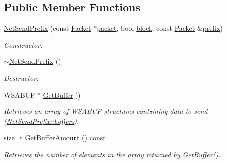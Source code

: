 \subsection*{Public Member Functions}
\begin{DoxyCompactItemize}
\item 
\hyperlink{class_net_send_prefix_ab162e1f6996ef9059b781a2c3afd71f6}{NetSendPrefix} (const \hyperlink{class_packet}{Packet} $\ast$\hyperlink{class_net_send_prefix_a90e39e80bb44c4bdd111ca489a66094e}{packet}, bool \hyperlink{class_net_send_afd9338a4ab3648178d0b5c816a0852d1}{block}, const \hyperlink{class_packet}{Packet} \&\hyperlink{class_net_send_prefix_a56b813ee0be98a6a23bdcc00863b8bba}{prefix})
\begin{DoxyCompactList}\small\item\em Constructor. \item\end{DoxyCompactList}\item 
\hypertarget{class_net_send_prefix_ad4c8d156cd9eea6897d09bdfbdda3e0c}{
\hyperlink{class_net_send_prefix_ad4c8d156cd9eea6897d09bdfbdda3e0c}{$\sim$NetSendPrefix} ()}
\label{class_net_send_prefix_ad4c8d156cd9eea6897d09bdfbdda3e0c}

\begin{DoxyCompactList}\small\item\em Destructor. \item\end{DoxyCompactList}\item 
WSABUF $\ast$ \hyperlink{class_net_send_prefix_a643683e8ce7bf977c076ad6eb493df99}{GetBuffer} ()
\begin{DoxyCompactList}\small\item\em Retrieves an array of WSABUF structures containing data to send (\hyperlink{class_net_send_prefix_a5826e25aab8cc3719dca77eb991d7861}{NetSendPrefix::buffers}). \item\end{DoxyCompactList}\item 
size\_\-t \hyperlink{class_net_send_prefix_ad6743175990adfcc2fd655f5d17d49e3}{GetBufferAmount} () const 
\begin{DoxyCompactList}\small\item\em Retrieves the number of elements in the array returned by \hyperlink{class_net_send_prefix_a643683e8ce7bf977c076ad6eb493df99}{GetBuffer()}. \item\end{DoxyCompactList}\end{DoxyCompactItemize}

